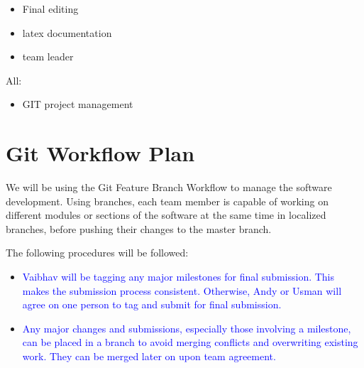 \documentclass{article}
\begin{document}
\begin{itemize}
\item Final editing
\item latex documentation
\item team leader\\
\end{itemize}

All: 
\begin{itemize}
\item GIT project management
\end{itemize}

\section{Git Workflow Plan}
We will be using the Git Feature Branch Workflow to manage the software development. Using branches, each team member is capable of 
working on different modules or sections of the software at the same time in localized branches, before pushing their changes to the master branch.

The following procedures will be followed:
\begin{itemize}
\item \textcolor{blue}{Vaibhav will be tagging any major milestones for final submission. This makes the submission process consistent. Otherwise, Andy or Usman will agree on one person to tag and submit for final submission.}
\item \textcolor{blue}{Any major changes and submissions, especially those involving a milestone, can be placed in a branch to avoid merging conflicts and overwriting existing work. They can be merged later on upon team agreement.}
\end{itemize}
\end{document}
